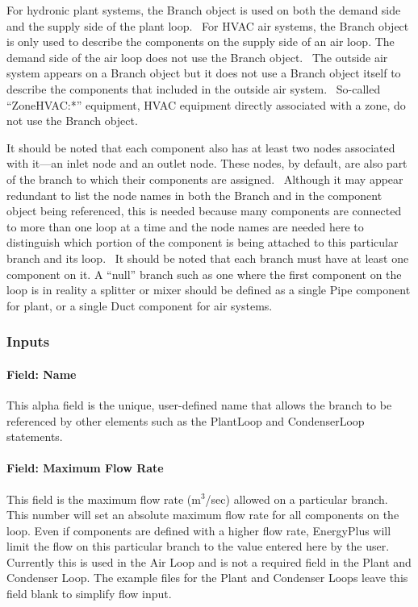 For hydronic plant systems, the Branch object is used on both the demand side and the supply side of the plant loop.~ For HVAC air systems, the Branch object is only used to describe the components on the supply side of an air loop. The demand side of the air loop does not use the Branch object.~ The outside air system appears on a Branch object but it does not use a Branch object itself to describe the components that included in the outside air system.~ So-called ``ZoneHVAC:*'' equipment, HVAC equipment directly associated with a zone, do not use the Branch object.

It should be noted that each component also has at least two nodes associated with it---an inlet node and an outlet node. These nodes, by default, are also part of the branch to which their components are assigned.~ Although it may appear redundant to list the node names in both the Branch and in the component object being referenced, this is needed because many components are connected to more than one loop at a time and the node names are needed here to distinguish which portion of the component is being attached to this particular branch and its loop.~ It should be noted that each branch must have at least one component on it. A ``null'' branch such as one where the first component on the loop is in reality a splitter or mixer should be defined as a single Pipe component for plant, or a single Duct component for air systems.

\subsubsection{Inputs}\label{inputs-2-023}

\paragraph{Field: Name}\label{field-name-2-022}

This alpha field is the unique, user-defined name that allows the branch to be referenced by other elements such as the PlantLoop and CondenserLoop statements.

\paragraph{Field: Maximum Flow Rate}\label{field-maximum-flow-rate-001}

This field is the maximum flow rate (m\(^{3}\)/sec) allowed on a particular branch. This number will set an absolute maximum flow rate for all components on the loop. Even if components are defined with a higher flow rate, EnergyPlus will limit the flow on this particular branch to the value entered here by the user. Currently this is used in the Air Loop and is not a required field in the Plant and Condenser Loop. The example files for the Plant and Condenser Loops leave this field blank to simplify flow input.

